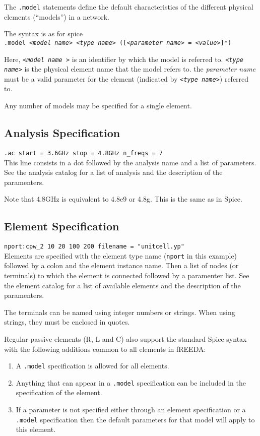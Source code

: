 The {\tt .model} statements define the default characteristics of the
different physical elements (``models'') in a network.

The syntax is as for spice \medskip \\
{\tt .model  <{\it model name}> <{\it type name}> ([<{\it parameter name}> =
<{\it value}>]*) }

Here, {\tt <{\it model name }>} is an identifier by which the model is
referred to.  {\tt <{\it type name}>} is the physical element name
that the model refers to.  the {\it parameter name} must be a valid
parameter for the element (indicated by {\tt <{\it type name}>})
referred to.

Any number of models may be specified for a single element.

\subsection[Analysis Specification]{Analysis Specification}

{\tt .ac start = 3.6GHz stop = 4.8GHz n\_freqs = 7} \medskip \\
This line consists in a dot followed by the analysis name and a list
of parameters. See the analysis catalog for a list of analysis and the
description of the paramenters.

Note that 4.8GHz is equivalent to 4.8e9 or 4.8g. This is the same as
in Spice. 

\subsection[Element Specification]{Element Specification}

{\tt nport:cpw\_2 10 20 100 200 filename = "unitcell.yp"} \medskip \\
Elements are specified with the element type name ({\tt nport} in this
example) followed by a colon and the element instance name. Then a
list of nodes (or terminals) to which the element is connected
followed by a paramenter list. See the element catalog for a list of
available elements and the description of the paramenters.

The terminals can be named using integer numbers or strings. When
using strings, they must be enclosed in quotes.

Regular passive elements (R, L and C) also support the standard Spice
syntax with the following additions common to all elements in fREEDA:
\begin{enumerate}
\item A {\tt .model} specification is allowed for all elements.
\item Anything that can appear in a {\tt .model} specification can be
      included in the specification of the element.
\item If a parameter is not specified either through an  element
specification or a {\tt.model} specification then the default
parameters for that model will apply to this element.
\end{enumerate}

